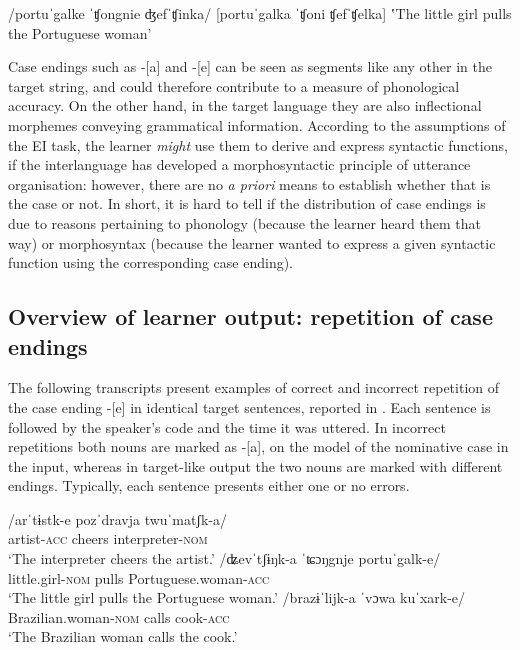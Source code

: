\ea%
    \label{ex:04:4}
    \ea\label{ex:04:4a}
    /portuˈgalke ˈʧongnie ʤefˈʧinka/
    \ex\label{ex:04:4b}
    [portuˈgalka ˈʧoni ʧefˈʧelka]
    \glt ‛The little girl pulls the Portuguese woman'
    \z
\z

Case endings such as -[a] and -[e] can be seen as segments like any other in the target string, and could therefore contribute to a measure of phonological accuracy. On the other hand, in the target language they are also inflectional morphemes conveying grammatical information. According to the assumptions of the EI task, the learner \textit{might} use them to derive and express syntactic functions, if the interlanguage has developed a morphosyntactic principle of utterance organisation: however, there are no \textit{a priori} means to establish whether that is the case or not. In short, it is hard to tell if the distribution of case endings is due to reasons pertaining to phonology (because the learner heard them that way) or morphosyntax (because the learner wanted to express a given syntactic function using the corresponding case ending).

\subsection{Overview of learner output: repetition of case endings}\label{sec:04:2.2}

The following transcripts present examples of correct  and incorrect  repetition of the case ending -[e] in identical target sentences, reported in . Each sentence is followed by the speaker’s code and the time it was uttered. In incorrect repetitions both nouns are marked as -[a], on the model of the nominative case in the input, whereas in target-like output the two nouns are marked with different endings. Typically, each sentence presents either one or no errors.

\ea%
    \label{ex:04:5}
    \ea\label{ex:04:5a}
    \gll    /arˈtɨstk-e   pozˈdravja   twuˈmatʃk-a/\\
            artist-\textsc{acc}  cheers    interpreter-\textsc{nom}\\
    \glt    ‘The interpreter cheers the artist.’
    \ex\label{ex:04:5b}
    \gll    /ʥevˈtʃɨŋk-a  ˈʨɔŋgnje   portuˈgalk-e/\\
            little.girl-\textsc{nom}  pulls    Portuguese.woman-\textsc{acc}\\
    \glt    ‘The little girl pulls the Portuguese woman.’
    \ex\label{ex:04:5c}
    \gll    /brazɨˈlijk-a     ˈvɔwa   kuˈxark-e/\\
            Brazilian.woman-\textsc{nom}  calls  cook-\textsc{acc}\\
    \glt    ‘The Brazilian woman calls the cook.’
    \z
\z

